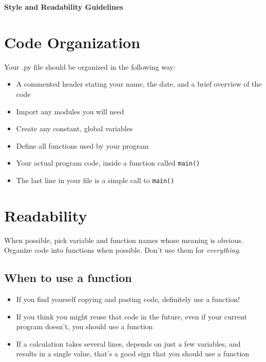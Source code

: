 \documentclass{article}
\begin{document}
\fancyfoot[C]{\thepage}
\vspace*{0cm}
\begin{center}
	{\LARGE \textbf{Style and Readability Guidelines}}\\
	\vspace{.25cm}
\end{center}

\section*{Code Organization}
Your .py file should be organized in the following way:
\begin{itemize}
	\item A commented header stating your name, the date, and a brief overview of the code
	\item Import any modules you will need 
	\item Create any constant, global variables
	\item Define all functions used by your program
	\item Your actual program code, inside a function called \texttt{main()}
	\item The last line in your file is a simple call to \texttt{main()}
\end{itemize}
\section*{Readability}
When possible, pick variable and function names whose meaning is obvious. Organize code into functions when possible. Don't use them for \textit{everything}.
\subsection*{When to use a function}
\begin{itemize}
\item If you find yourself copying and pasting code, definitely use a function!
\item If you think you might reuse that code in the future, even if your current program doesn't, you should use a function
\item If a calculation takes several lines, depends on just a few variables, and results in a single value, that's a good sign that you should use a function
\end{itemize}
\end{document}
